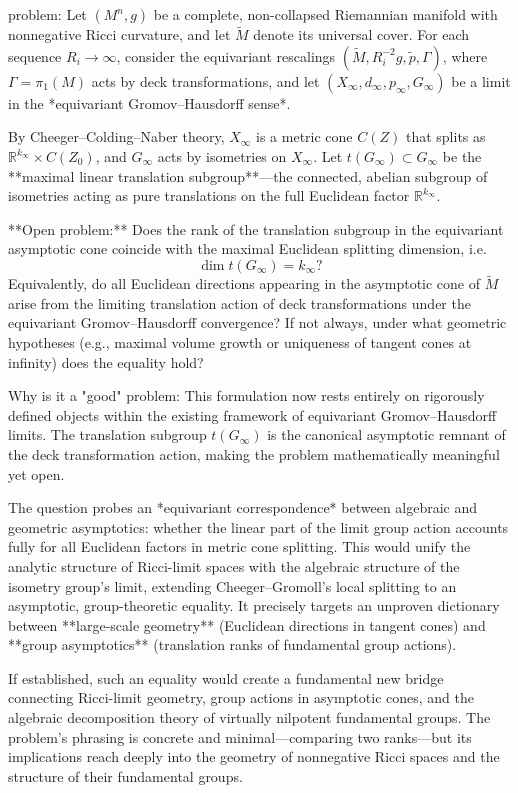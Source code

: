 problem:  
Let \((M^n, g)\) be a complete, non-collapsed Riemannian manifold with nonnegative Ricci curvature, and let \(\tilde M\) denote its universal cover. For each sequence \(R_i \to \infty\), consider the equivariant rescalings \((\tilde M, R_i^{-2} g, \tilde p, \Gamma)\), where \(\Gamma = \pi_1(M)\) acts by deck transformations, and let \((X_\infty, d_\infty, p_\infty, G_\infty)\) be a limit in the *equivariant Gromov–Hausdorff sense*.  

By Cheeger–Colding–Naber theory, \(X_\infty\) is a metric cone \(C(Z)\) that splits as \(\mathbb{R}^{k_\infty} \times C(Z_0)\), and \(G_\infty\) acts by isometries on \(X_\infty\).  
Let \(t(G_\infty) \subset G_\infty\) be the **maximal linear translation subgroup**—the connected, abelian subgroup of isometries acting as pure translations on the full Euclidean factor \(\mathbb{R}^{k_\infty}\).  

**Open problem:**  
Does the rank of the translation subgroup in the equivariant asymptotic cone coincide with the maximal Euclidean splitting dimension, i.e.
\[
\dim t(G_\infty) = k_\infty?
\]
Equivalently, do all Euclidean directions appearing in the asymptotic cone of \(\tilde M\) arise from the limiting translation action of deck transformations under the equivariant Gromov–Hausdorff convergence?  
If not always, under what geometric hypotheses (e.g., maximal volume growth or uniqueness of tangent cones at infinity) does the equality hold?

Why is it a "good" problem:  
This formulation now rests entirely on rigorously defined objects within the existing framework of equivariant Gromov–Hausdorff limits. The translation subgroup \(t(G_\infty)\) is the canonical asymptotic remnant of the deck transformation action, making the problem mathematically meaningful yet open.  

The question probes an *equivariant correspondence* between algebraic and geometric asymptotics: whether the linear part of the limit group action accounts fully for all Euclidean factors in metric cone splitting. This would unify the analytic structure of Ricci-limit spaces with the algebraic structure of the isometry group’s limit, extending Cheeger–Gromoll’s local splitting to an asymptotic, group-theoretic equality. It precisely targets an unproven dictionary between **large-scale geometry** (Euclidean directions in tangent cones) and **group asymptotics** (translation ranks of fundamental group actions).  

If established, such an equality would create a fundamental new bridge connecting Ricci-limit geometry, group actions in asymptotic cones, and the algebraic decomposition theory of virtually nilpotent fundamental groups. The problem’s phrasing is concrete and minimal—comparing two ranks—but its implications reach deeply into the geometry of nonnegative Ricci spaces and the structure of their fundamental groups.